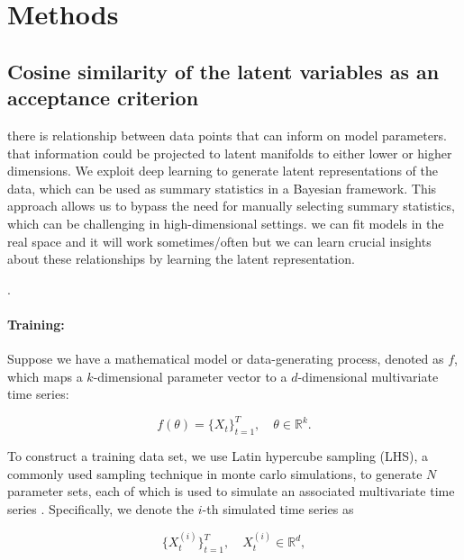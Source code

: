 \documentclass[12pt]{article} %
\newcommand{\para}[1]{\vspace*{-4.5mm}\paragraph{#1}}
\newcommand{\blue}[1]{{\color{magenta}{#1}}}
\begin{document}

\newpage
\section*{Methods}
\subsection*{Cosine similarity of the latent variables as an acceptance criterion}


there is relationship between data points that can inform on model parameters. that information could be projected to latent manifolds to either lower or higher dimensions. 
We exploit deep learning to generate latent representations of the data, which can be used as summary statistics in a Bayesian framework.
This approach allows us to bypass the need for manually selecting summary statistics, which can be challenging in high-dimensional settings. 
we can fit models in the real space and it will work sometimes/often but we can learn crucial insights about these relationships by learning the latent representation.

\blue{simulation based inference}.

\para{Training:}
Suppose we have a mathematical model or data-generating process, denoted as \( f \), which maps a \( k \)-dimensional parameter vector to a \( d \)-dimensional multivariate time series:  

$$
f(\theta) = \{X_t\}_{t=1}^T, \quad \theta \in \mathbb{R}^k.
$$  

To construct a training data set, we use Latin hypercube sampling (LHS), a commonly used sampling technique in monte carlo simulations, to generate \( N \)  parameter sets, each of which is used to simulate an associated multivariate time series \citep{}. Specifically, we denote the \( i \)-th simulated time series as  

$$
\{X_{t}^{(i)}\}_{t=1}^T, \quad X_t^{(i)} \in \mathbb{R}^d,
$$  
\end{document}
